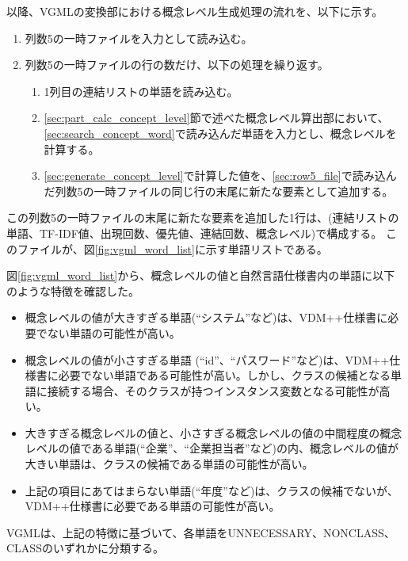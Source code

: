 以降、VGMLの変換部における概念レベル生成処理の流れを、以下に示す。

\begin{enumerate}
    \item 列数5の一時ファイルを入力として読み込む。
    \label{sec:row5_file}
    \item 列数5の一時ファイルの行の数だけ、以下の処理を繰り返す。
        \begin{enumerate}
            \item 1列目の連結リストの単語を読み込む。
            \label{sec:search_concept_word}
            \item \ref{sec:part_calc_concept_level}節で述べた概念レベル算出部において、\ref{sec:search_concept_word}で読み込んだ単語を入力とし、概念レベルを計算する。
            \label{sec:generate_concept_level}
            \item \ref{sec:generate_concept_level}で計算した値を、\ref{sec:row5_file}で読み込んだ列数5の一時ファイルの同じ行の末尾に新たな要素として追加する。
        \end{enumerate}
\end{enumerate}

この列数5の一時ファイルの末尾に新たな要素を追加した1行は、(連結リストの単語、TF-IDF値、出現回数、優先値、連結回数、概念レベル)で構成する。
このファイルが、図\ref{fig:vgml_word_list}に示す単語リストである。

図\ref{fig:vgml_word_list}から、概念レベルの値と自然言語仕様書内の単語に以下のような特徴を確認した。

\begin{itemize}
    \item 概念レベルの値が大きすぎる単語(``システム''など)は、VDM++仕様書に必要でない単語の可能性が高い。
    \item 概念レベルの値が小さすぎる単語 (``id''、``パスワード''など)は、VDM++仕様書に必要でない単語である可能性が高い。しかし、クラスの候補となる単語に接続する場合、そのクラスが持つインスタンス変数となる可能性が高い。
    \item 大きすぎる概念レベルの値と、小さすぎる概念レベルの値の中間程度の概念レベルの値である単語(``企業''、``企業担当者''など)の内、概念レベルの値が大きい単語は、クラスの候補である単語の可能性が高い。
    \item 上記の項目にあてはまらない単語(``年度''など)は、クラスの候補でないが、VDM++仕様書に必要である単語の可能性が高い。
\end{itemize}

VGMLは、上記の特徴に基づいて、各単語をUNNECESSARY、NONCLASS、CLASSのいずれかに分類する。

